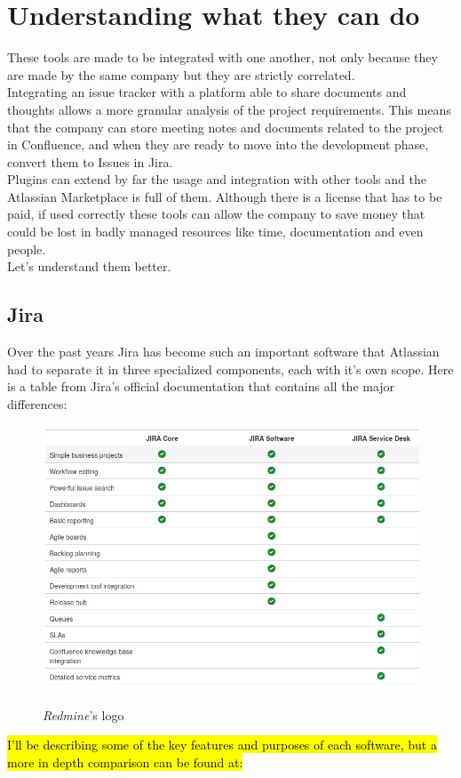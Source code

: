 \section{Understanding what they can do}
	These tools are made to be integrated with one another, not only because they are made by the same company but they are strictly correlated.\\
	Integrating an issue tracker with a platform able to share documents and thoughts allows a more granular analysis of the project requirements.
	This means that the company can store meeting notes and documents related to the project in Confluence, and when they are ready to move into the development phase, convert them to Issues in Jira.\\
	Plugins can extend by far the usage and integration with other tools and the Atlassian Marketplace is full of them.
	Although there is a license that has to be paid, if used correctly these tools can allow the company to save money that could be lost in badly managed resources like time, documentation and even people.\\
	Let's understand them better.
	
	\subsection{Jira}
		Over the past years Jira has become such an important software that Atlassian had to separate it in three specialized components, each with it's own scope.
		Here is a table from Jira's official documentation that contains all the major differences:
		\begin{figure}[H]
			\centering
			\includegraphics[width=\textwidth]{resources/jira_type}\\
			\caption{\textit{Redmine}'s logo}
		\end{figure}
		\hl{I'll be describing some of the key features and purposes of each software, but a more in depth comparison can be found at:}
		
